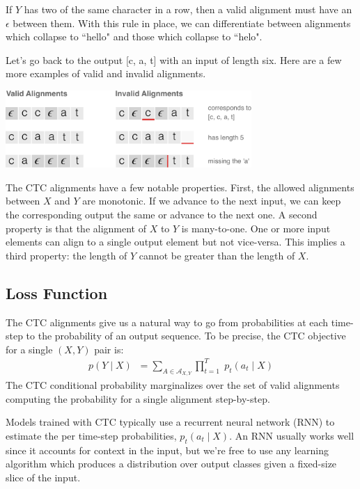If $Y$ has two of the same character in a row, then a valid alignment must have
an $\epsilon$ between them. With this rule in place, we can differentiate
between alignments which collapse to ``hello" and those which collapse to
``helo".

Let's go back to the output [c, a, t] with an input of length six. Here are
a few more examples of valid and invalid alignments.

\begin{center}
\includegraphics[width=0.7\textwidth]{background/figures/valid_invalid_alignments.pdf}
\end{center}

The CTC alignments have a few notable properties. First, the allowed alignments
between $X$ and $Y$ are monotonic.  If we advance to the next input, we can
keep the corresponding output the same or advance to the next one. A second
property is that the alignment of $X$ to $Y$ is many-to-one. One or more input
elements can align to a single output element but not vice-versa. This implies
a third property: the length of $Y$ cannot be greater than the length of $X$.

\subsection{Loss Function}

The CTC alignments give us a natural way to go from probabilities at each
time-step to the probability of an output sequence. To be precise, the CTC
objective for a single $(X, Y)$ pair is:
\begin{align*}
p(Y \mid X) \;\; = \sum_{A \in \mathcal{A}_{X,Y}}
      \prod_{t=1}^T \; p_t(a_t \mid X)
\end{align*}
The CTC conditional probability marginalizes over the set of valid alignments
computing the probability for a single alignment step-by-step.

Models trained with CTC typically use a recurrent neural network (RNN) to
estimate the per time-step probabilities, $p_t(a_t \mid X)$. An RNN usually
works well since it accounts for context in the input, but we're free to use
any learning algorithm which produces a distribution over output classes given
a fixed-size slice of the input.

